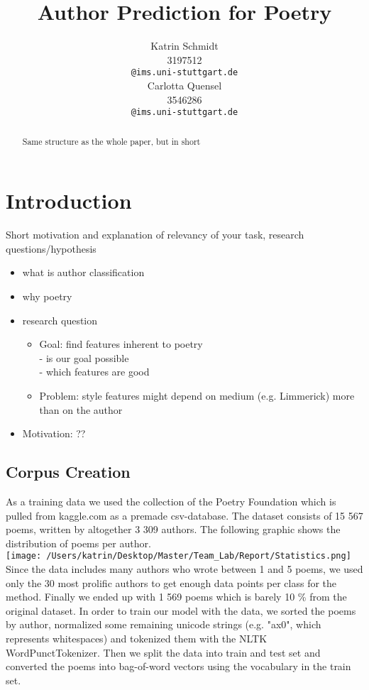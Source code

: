 \documentclass[11pt]{article}
\title{Author Prediction for Poetry}
\author{Katrin Schmidt \\
   3197512\\
  \texttt{@ims.uni-stuttgart.de} \\\And
  Carlotta Quensel \\
  3546286 \\
  \texttt{@ims.uni-stuttgart.de} \\}
\begin{document}
\maketitle
\begin{abstract}
Same structure as the whole paper, but in short
\end{abstract}

\section{Introduction}
Short motivation and explanation of relevancy
of your task, research questions/hypothesis
\begin{itemize}
\item what is author classification
\item why poetry
\item research question
\begin{itemize}
\item Goal: find features inherent to poetry\\- is our goal possible\\- which features are good
\item Problem: style features might depend on medium (e.g. Limmerick) more than on the author
\end{itemize}
\item Motivation: ??
\end{itemize}

\subsection{Corpus Creation}
As a training data we used the collection of the Poetry Foundation which is pulled from kaggle.com as a premade csv-database. The dataset consists of 15 567 poems, written by altogether 3 309 authors. The following graphic shows the distribution of poems per author. \\

\texttt{[image: /Users/katrin/Desktop/Master/Team\_Lab/Report/Statistics.png]}
\\

Since the data includes many authors who wrote between 1 and 5 poems, we used only the 30 most prolific authors to get enough data points per class for the method. Finally we ended up with 1 569 poems which is barely 10 \% from the original dataset.
In order to train our model with the data, we sorted the poems by author, normalized some remaining unicode strings (e.g. "ax0", which represents whitespaces) and tokenized them with the NLTK WordPunctTokenizer. Then we split the data into train and test set and converted the poems into bag-of-word vectors using the vocabulary in the train set.
\end{document}
